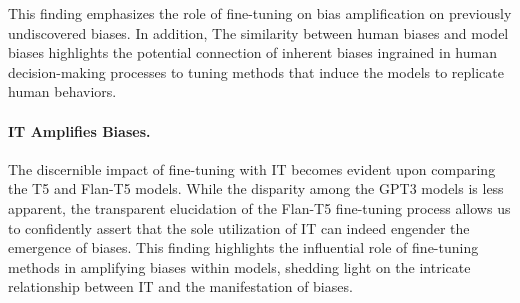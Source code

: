 
This finding emphasizes the role of fine-tuning on bias amplification on previously undiscovered biases.
In addition, The similarity between human biases and model biases highlights the potential connection of inherent biases ingrained in human decision-making processes to tuning methods that induce the models to replicate human behaviors. 

\paragraph{IT Amplifies Biases.}

The discernible impact of fine-tuning with IT becomes evident upon comparing the T5 and Flan-T5 models.
While the disparity among the GPT3 models is less apparent, the transparent elucidation of the Flan-T5 fine-tuning process allows us to confidently assert that the sole utilization of IT can indeed engender the emergence of biases.
This finding highlights the influential role of fine-tuning methods in amplifying biases within models, shedding light on the intricate relationship between IT and the manifestation of biases.



